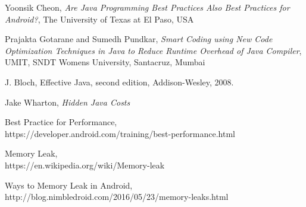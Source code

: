 \documentclass[journal]{IEEEtran}
\begin{document}
\begin{thebibliography}{1}

\bibitem{}
Yoonsik Cheon, \emph{Are Java Programming Best Practices Also Best Practices for Android?}, The University of Texas at El Paso, USA

\bibitem{}
Prajakta Gotarane and Sumedh Pundkar, \emph{Smart Coding using New Code Optimization Techniques in Java to Reduce Runtime Overhead of Java Compiler}, UMIT, SNDT Womens University, Santacruz, Mumbai

\bibitem{}
J. Bloch, Effective Java, second edition, Addison-Wesley, 2008.

\bibitem{}
Jake Wharton, \emph{Hidden Java Costs}

\bibitem{}
Best Practice for Performance,\\
https://developer.android.com/training/best-performance.html 

\bibitem{}
Memory Leak,\\
https://en.wikipedia.org/wiki/Memory-leak

\bibitem{}
Ways to Memory Leak in Android,\\
http://blog.nimbledroid.com/2016/05/23/memory-leaks.html

\end{thebibliography}
\end{document}
